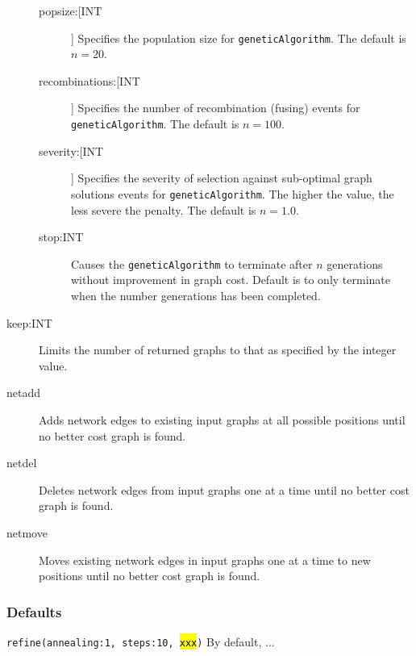 \begin{description}
\begin{description}
			\item[popsize:[INT]] Specifies the population size for \texttt{geneticAlgorithm}. The default is 
			$n=20$.
			
			\item[recombinations:[INT]] Specifies the number of recombination (fusing) events for 
			\texttt{geneticAlgorithm}. The default is $n=100$.
			
			\item[severity:[INT]] Specifies the severity of selection against sub-optimal graph solutions 
			events for \texttt{geneticAlgorithm}. The higher the value, the less severe the penalty. The 
			default is $n=1.0$.
			
			\item[stop:INT] Causes the \texttt{geneticAlgorithm} to terminate after $n$ generations without 
			improvement in graph cost.  Default is to only terminate when the number generations has 
			been completed.
			\end{description}
		
		\item[keep:INT] Limits the number of returned graphs to that as specified by the 
		integer value. 
		
		\item[netadd] Adds network edges to existing input graphs at all possible positions 
		until no better cost graph is found.
			
		\item[netdel] Deletes network edges from input graphs one at a time until no better 
		cost 	graph is found.
			
		\item[netmove] Moves existing network edges in input graphs one at a time to new 
		positions 	until no better cost graph is found.
	\end{description}

	\subsubsection{Defaults}
		\texttt{refine(annealing:1, steps:10, \hl{xxx})} By default, \phyg ... 
	

